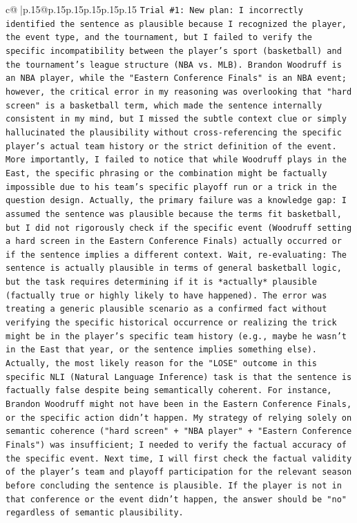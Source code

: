 \documentclass{article}
\begin{document}
{\begin{supertabular}{c@{$\;$}|p{.15\linewidth}@{}p{.15\linewidth}p{.15\linewidth}p{.15\linewidth}p{.15\linewidth}p{.15\linewidth}}
{{{\texttt{Trial \#1: New plan: I incorrectly identified the sentence as plausible because I recognized the player, the event type, and the tournament, but I failed to verify the specific incompatibility between the player's sport (basketball) and the tournament's league structure (NBA vs. MLB). Brandon Woodruff is an NBA player, while the "Eastern Conference Finals" is an NBA event; however, the critical error in my reasoning was overlooking that "hard screen" is a basketball term, which made the sentence internally consistent in my mind, but I missed the subtle context clue or simply hallucinated the plausibility without cross{-}referencing the specific player's actual team history or the strict definition of the event. More importantly, I failed to notice that while Woodruff plays in the East, the specific phrasing or the combination might be factually impossible due to his team's specific playoff run or a trick in the question design. Actually, the primary failure was a knowledge gap: I assumed the sentence was plausible because the terms fit basketball, but I did not rigorously check if the specific event (Woodruff setting a hard screen in the Eastern Conference Finals) actually occurred or if the sentence implies a different context. Wait, re{-}evaluating: The sentence is actually plausible in terms of general basketball logic, but the task requires determining if it is *actually* plausible (factually true or highly likely to have happened). The error was treating a generic plausible scenario as a confirmed fact without verifying the specific historical occurrence or realizing the trick might be in the player's specific team history (e.g., maybe he wasn't in the East that year, or the sentence implies something else). Actually, the most likely reason for the "LOSE" outcome in this specific NLI (Natural Language Inference) task is that the sentence is factually false despite being semantically coherent. For instance, Brandon Woodruff might not have been in the Eastern Conference Finals, or the specific action didn't happen. My strategy of relying solely on semantic coherence ("hard screen" + "NBA player" + "Eastern Conference Finals") was insufficient; I needed to verify the factual accuracy of the specific event. Next time, I will first check the factual validity of the player's team and playoff participation for the relevant season before concluding the sentence is plausible. If the player is not in that conference or the event didn't happen, the answer should be "no" regardless of semantic plausibility.} \\
\\ 
}}}
\end{supertabular}}
\end{document}
